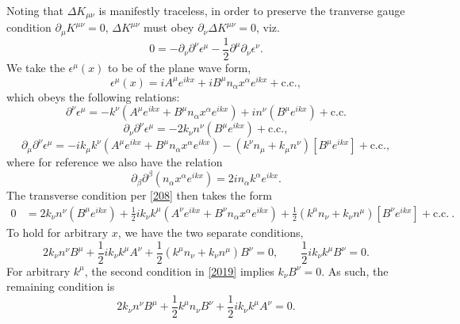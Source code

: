 \documentclass[10pt,letterpaper]{article}
\numberwithin{equation}{subsection}
\begin{document}
Noting that $\Delta K_{\mu\nu}$ is manifestly traceless, in order to preserve the tranverse gauge condition $\partial_\mu K^{\mu\nu} = 0$,  $\Delta K^{\mu\nu}$ must obey $\partial_\nu \Delta K^{\mu\nu}=0$, viz.
\begin{equation}
	0 =
	-\partial_\nu \partial^\nu \epsilon^\mu - \frac12 \partial^\mu \partial_\nu \epsilon^\nu .\label{208}
\end{equation}
We take the $\epsilon^\mu(x)$ to be of the plane wave form,
\begin{equation}
\epsilon^\mu(x) = i A^\mu e^{ikx} + iB^\mu n_\alpha x^\alpha e^{ikx} + \text{c.c.},
\end{equation}
which obeys the following relations:
\begin{equation}
\partial^\nu \epsilon^\mu = - k^\nu\left(A^\mu e^{ikx} + B^\mu n_\alpha x^\alpha e^{ikx}\right)+ 
i n^\nu \left(  B^\mu  e^{ikx} \right)+ \text{c.c.}
\end{equation}
\begin{equation}
\partial_\nu \partial^\nu \epsilon^\mu = -2k_\nu n^\nu \left(B^\mu  e^{ikx}\right)+\text{c.c.},
\end{equation}
\begin{equation}
\partial_\mu \partial^\nu \epsilon^\mu = -i k_\mu k^\nu\left(A^\mu e^{ikx} +  B^\mu n_\alpha x^\alpha e^{ikx}\right)
- (k^\nu n_\mu+k_\mu n^\nu)\left[ B^\mu e^{ikx}\right] + \text{c.c.},
\end{equation}
where for reference we also have the relation
\begin{equation}
\partial_\beta \partial^\beta (n_\alpha x^\alpha e^{ikx}) = 2i n_\alpha k^\alpha e^{ikx}.
\end{equation}
The transverse condition per \eqref{208} then takes the form
\begin{align}
0 {}&= 2k_\nu n^\nu \left(B^\mu  e^{ikx}\right)+\frac12 i k_\nu k^\mu\left(A^\nu e^{ikx} +  B^\nu n_\alpha x^\alpha e^{ikx}\right)
+\frac12 (k^\mu n_\nu+k_\nu n^\mu)\left[ B^\nu e^{ikx}\right]+ \text{c.c.}\ .
\end{align}
To hold for arbitrary $x$, we have the two separate conditions,
\begin{equation}
2k_\nu n^\nu B^\mu +\frac12 ik_\nu k^\mu A^\nu + \frac12 (k^\mu n_\nu+k_\nu n^\mu)B^\nu=0,\qquad \frac12 ik_\nu k^\mu B^\nu=0.\label{2019}
\end{equation}
For arbitrary $k^\mu$, the second condition in \ref{2019} implies $k_\nu B^\nu = 0$. As such, the remaining condition is
\begin{equation}
2k_\nu n^\nu B^\mu + \frac12 k^\mu n_\nu B^\nu + \frac12 i k_\nu k^\mu A^\nu = 0.
\end{equation}
\end{document}
